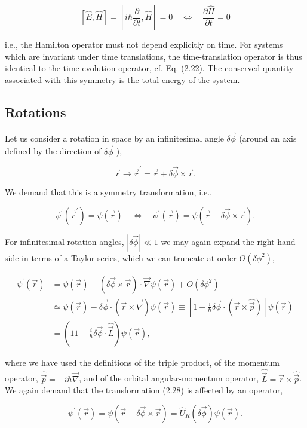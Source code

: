 \documentclass[10pt, letterpaper]{article}
\begin{document}
$$
[\hat{E}, \hat{H}]=\left[i \hbar \frac{\partial}{\partial t}, \hat{H}\right]=0 \quad \Longleftrightarrow \quad \frac{\partial \hat{H}}{\partial t}=0
$$

i.e., the Hamilton operator must not depend explicitly on time. For systems which are invariant under time translations, the time-translation operator is thus identical to the time-evolution operator, cf. Eq. (2.22). The conserved quantity associated with this symmetry is the total energy of the system.

\subsection{Rotations}
Let us consider a rotation in space by an infinitesimal angle $\delta \vec{\phi}$ (around an axis defined by the direction of $\delta \vec{\phi}$ ),

$$
\vec{r} \longrightarrow \vec{r}^{\prime}=\vec{r}+\delta \vec{\phi} \times \vec{r} .
$$

We demand that this is a symmetry transformation, i.e.,

$$
\psi^{\prime}\left(\vec{r}^{\prime}\right)=\psi(\vec{r}) \quad \Longleftrightarrow \quad \psi^{\prime}(\vec{r})=\psi(\vec{r}-\delta \vec{\phi} \times \vec{r}) .
$$

For infinitesimal rotation angles, $|\delta \vec{\phi}| \ll 1$ we may again expand the right-hand side in terms of a Taylor series, which we can truncate at order $O\left(\delta \phi^{2}\right)$,

$$
\begin{aligned}
\psi^{\prime}(\vec{r}) & =\psi(\vec{r})-(\delta \vec{\phi} \times \vec{r}) \cdot \vec{\nabla} \psi(\vec{r})+O\left(\delta \phi^{2}\right) \\
& \simeq \psi(\vec{r})-\delta \vec{\phi} \cdot(\vec{r} \times \vec{\nabla}) \psi(\vec{r}) \equiv\left[1-\frac{i}{\hbar} \delta \vec{\phi} \cdot(\vec{r} \times \hat{\vec{p}})\right] \psi(\vec{r}) \\
& =\left(11-\frac{i}{\hbar} \delta \vec{\phi} \cdot \hat{\vec{L}}\right) \psi(\vec{r}),
\end{aligned}
$$

where we have used the definitions of the triple product, of the momentum operator, $\hat{\vec{p}}=-i \hbar \vec{\nabla}$, and of the orbital angular-momentum operator, $\hat{\vec{L}}=\vec{r} \times \hat{\vec{p}}$. We again demand that the transformation (2.28) is affected by an operator,

$$
\psi^{\prime}(\vec{r})=\psi(\vec{r}-\delta \vec{\phi} \times \vec{r})=\hat{U}_{R}(\delta \vec{\phi}) \psi(\vec{r}) .
$$
\end{document}
